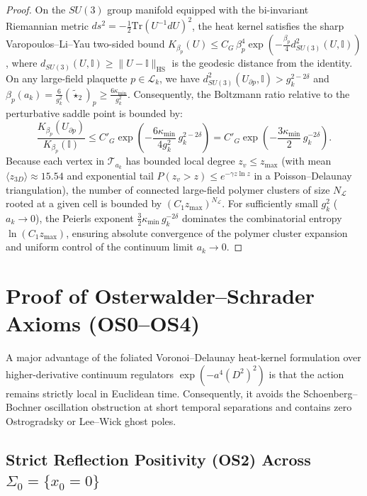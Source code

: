 \documentclass[11pt, a4paper]{article}
\theoremstyle{definition}
\theoremstyle{remark}
\begin{document}
\begin{proof}
On the $SU(3)$ group manifold equipped with the bi-invariant Riemannian metric $ds^{2} = -\frac{1}{2}\mathrm{Tr}(U^{-1}dU)^{2}$, the heat kernel satisfies the sharp Varopoulos--Li--Yau two-sided bound $K_{\beta_{p}}(U) \le C_{G}\,\beta_{p}^{4}\exp\!\left(-\frac{\beta_{p}}{4}d_{SU(3)}^{2}(U, \mathbb{I})\right)$, where $d_{SU(3)}(U, \mathbb{I}) \ge \|U - \mathbb{I}\|_{\mathrm{HS}}$ is the geodesic distance from the identity. On any large-field plaquette $p \in \mathcal{L}_{k}$, we have $d_{SU(3)}^{2}(U_{\partial p}, \mathbb{I}) > g_{k}^{2-2\delta}$ and $\beta_{p}(a_{k}) = \frac{6}{g_{k}^{2}}(\tilde{\star}_{2})_{p} \ge \frac{6\kappa_{\min}}{g_{k}^{2}}$. Consequently, the Boltzmann ratio relative to the perturbative saddle point is bounded by:
\begin{equation}
  \frac{K_{\beta_{p}}(U_{\partial p})}{K_{\beta_{p}}(\mathbb{I})} \le C'_{G}\exp\!\left(-\frac{6\kappa_{\min}}{4g_{k}^{2}}\,g_{k}^{2-2\delta}\right) = C'_{G}\exp\!\left(-\frac{3\kappa_{\min}}{2}\,g_{k}^{-2\delta}\right).
\end{equation}
Because each vertex in $\mathcal{T}_{a_{k}}$ has bounded local degree $z_{v} \le z_{\max}$ (with mean $\langle z_{3D} \rangle \approx 15.54$ and exponential tail $P(z_{v} > z) \le e^{-\gamma z\ln z}$ in a Poisson--Delaunay triangulation), the number of connected large-field polymer clusters of size $N_{\mathcal{L}}$ rooted at a given cell is bounded by $(C_{1}z_{\max})^{N_{\mathcal{L}}}$. For sufficiently small $g_{k}^{2}$ ($a_{k} \to 0$), the Peierls exponent $\frac{3}{2}\kappa_{\min}\,g_{k}^{-2\delta}$ dominates the combinatorial entropy $\ln(C_{1}z_{\max})$, ensuring absolute convergence of the polymer cluster expansion and uniform control of the continuum limit $a_{k} \to 0$.
\end{proof}

\section{Proof of Osterwalder--Schrader Axioms (OS0--OS4)}

A major advantage of the foliated Voronoi--Delaunay heat-kernel formulation over higher-derivative continuum regulators $\exp(-a^{4}(D^{2})^{2})$ is that the action remains strictly local in Euclidean time. Consequently, it avoids the Schoenberg--Bochner oscillation obstruction at short temporal separations and contains zero Ostrogradsky or Lee--Wick ghost poles.

\subsection{Strict Reflection Positivity (OS2) Across $\Sigma_{0} = \{x_{0} = 0\}$}
\end{document}
